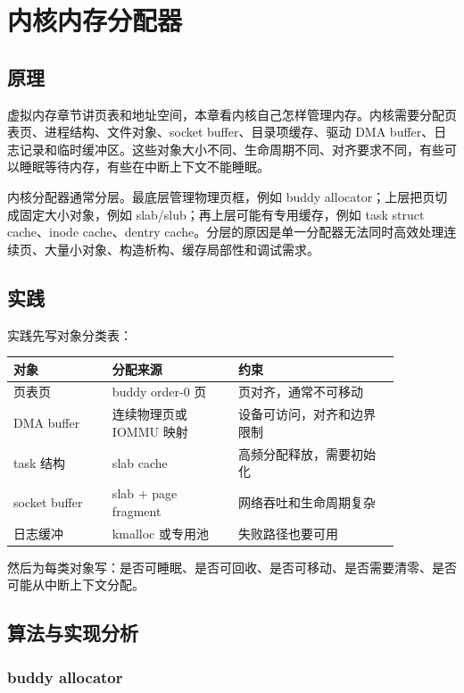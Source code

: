 \chapter{内核内存分配器}

\section{原理}

虚拟内存章节讲页表和地址空间，本章看内核自己怎样管理内存。内核需要分配页表页、进程结构、文件对象、socket buffer、目录项缓存、驱动 DMA buffer、日志记录和临时缓冲区。这些对象大小不同、生命周期不同、对齐要求不同，有些可以睡眠等待内存，有些在中断上下文不能睡眠。

内核分配器通常分层。最底层管理物理页框，例如 buddy allocator；上层把页切成固定大小对象，例如 slab/slub；再上层可能有专用缓存，例如 task struct cache、inode cache、dentry cache。分层的原因是单一分配器无法同时高效处理连续页、大量小对象、构造析构、缓存局部性和调试需求。

\section{实践}

实践先写对象分类表：

\begin{longtable}{|p{0.22\linewidth}|p{0.28\linewidth}|p{0.36\linewidth}|}
\toprule
对象 & 分配来源 & 约束 \\
\midrule
页表页 & buddy order-0 页 & 页对齐，通常不可移动 \\\tablerowrule
DMA buffer & 连续物理页或 IOMMU 映射 & 设备可访问，对齐和边界限制 \\\tablerowrule
task 结构 & slab cache & 高频分配释放，需要初始化 \\\tablerowrule
socket buffer & slab + page fragment & 网络吞吐和生命周期复杂 \\\tablerowrule
日志缓冲 & kmalloc 或专用池 & 失败路径也要可用 \\
\bottomrule
\end{longtable}

然后为每类对象写：是否可睡眠、是否可回收、是否可移动、是否需要清零、是否可能从中断上下文分配。

\section{算法与实现分析}

\subsection{buddy allocator}

